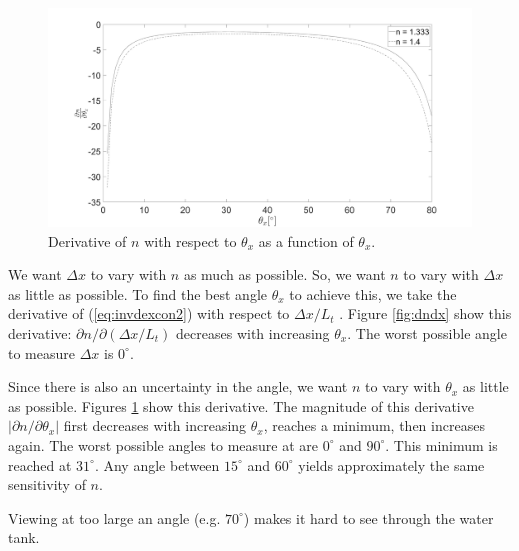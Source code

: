 \documentclass[smallextended]{svjour3}       %
\begin{document}
\begin{figure}[hpbt]
	\includegraphics[width=\textwidth, keepaspectratio]{dndt.png}
	\caption{Derivative of $n$ with respect to $\theta_x$ as a function of $\theta_x$.}		
	\label{fig:dndt}
\end{figure}

We want $\Delta x$ to vary with $n$ as much as possible. So, we want $n$ to vary with $\Delta x$ as little as possible.  To find the best angle $\theta_x$ to achieve this, we take the derivative of (\ref{eq:invdexcon2}) with respect to $\Delta x/L_t$ \cite{nemoto1992measurement}. Figure \ref{fig:dndx} show this derivative: $\partial n/\partial (\Delta x/L_t)$ decreases with increasing $\theta_x$. The worst possible angle to measure $\Delta x$ is $0^\circ$.

Since there is also an uncertainty in the angle, we want $n$ to vary with $\theta_x$ as little as possible. Figures \ref{fig:dndt} show this derivative. The magnitude of this derivative $\left|\partial n/\partial \theta_x\right|$ first decreases with increasing $\theta_x$, reaches a minimum, then increases again. The worst possible angles to measure at are $0^\circ$ and $90^\circ$. This minimum is reached at $31^\circ$. Any angle between $15^\circ$ and $60^\circ$ yields approximately the same sensitivity of $n$. 

Viewing at too large an angle (e.g. $70^\circ$) makes it hard to see through the water tank. 
\end{document}
